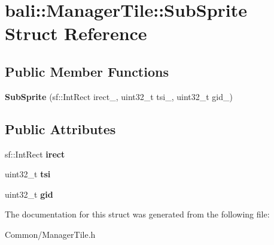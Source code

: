 \hypertarget{structbali_1_1_manager_tile_1_1_sub_sprite}{\section{bali\-:\-:Manager\-Tile\-:\-:Sub\-Sprite Struct Reference}
\label{structbali_1_1_manager_tile_1_1_sub_sprite}
}
\subsection*{Public Member Functions}
\begin{DoxyCompactItemize}
\item 
\hypertarget{structbali_1_1_manager_tile_1_1_sub_sprite_a51e9d02da5779470663d8aca7c435a92}{{\bfseries Sub\-Sprite} (sf\-::\-Int\-Rect irect\-\_\-, uint32\-\_\-t tsi\-\_\-, uint32\-\_\-t gid\-\_)}\label{structbali_1_1_manager_tile_1_1_sub_sprite_a51e9d02da5779470663d8aca7c435a92}

\end{DoxyCompactItemize}
\subsection*{Public Attributes}
\begin{DoxyCompactItemize}
\item 
\hypertarget{structbali_1_1_manager_tile_1_1_sub_sprite_a68dc8c1cda2918a11bee9ddb331c08cd}{sf\-::\-Int\-Rect {\bfseries irect}}\label{structbali_1_1_manager_tile_1_1_sub_sprite_a68dc8c1cda2918a11bee9ddb331c08cd}

\item 
\hypertarget{structbali_1_1_manager_tile_1_1_sub_sprite_a27fa8e7d8e784909a06463e3592f5a54}{uint32\-\_\-t {\bfseries tsi}}\label{structbali_1_1_manager_tile_1_1_sub_sprite_a27fa8e7d8e784909a06463e3592f5a54}

\item 
\hypertarget{structbali_1_1_manager_tile_1_1_sub_sprite_a6e9bb90a1fb74be13a314985e76f9ea8}{uint32\-\_\-t {\bfseries gid}}\label{structbali_1_1_manager_tile_1_1_sub_sprite_a6e9bb90a1fb74be13a314985e76f9ea8}

\end{DoxyCompactItemize}


The documentation for this struct was generated from the following file\-:\begin{DoxyCompactItemize}
\item 
Common/Manager\-Tile.\-h\end{DoxyCompactItemize}
